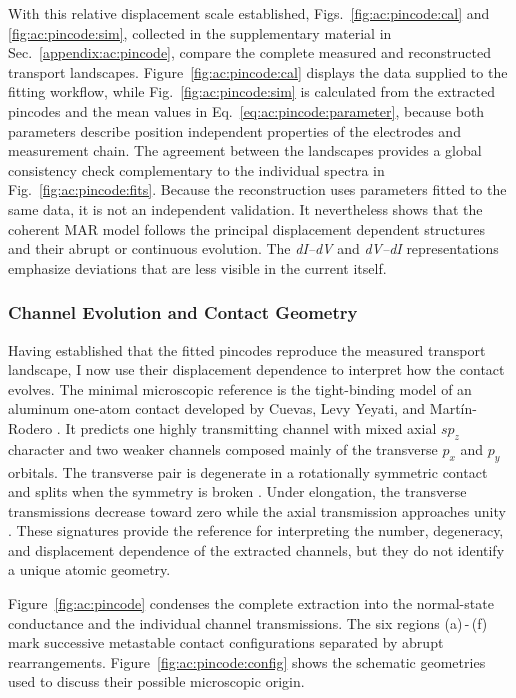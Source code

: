         With this relative displacement scale established, Figs.~\ref{fig:ac:pincode:cal} and \ref{fig:ac:pincode:sim}, collected in the supplementary material in Sec.~\ref{appendix:ac:pincode}, compare the complete measured and reconstructed transport landscapes. Figure~\ref{fig:ac:pincode:cal} displays the data supplied to the fitting workflow, while Fig.~\ref{fig:ac:pincode:sim} is calculated from the extracted pincodes and the mean values in Eq.~\eqref{eq:ac:pincode:parameter}, because both parameters describe position independent properties of the electrodes and measurement chain. The agreement between the landscapes provides a global consistency check complementary to the individual spectra in Fig.~\ref{fig:ac:pincode:fits}. Because the reconstruction uses parameters fitted to the same data, it is not an independent validation. It nevertheless shows that the coherent MAR model follows the principal displacement dependent structures and their abrupt or continuous evolution. The \textit{dI--dV} and \textit{dV--dI} representations emphasize deviations that are less visible in the current itself.


    \subsubsection*{Channel Evolution and Contact Geometry}

        Having established that the fitted pincodes reproduce the measured transport landscape, I now use their displacement dependence to interpret how the contact evolves. The minimal microscopic reference is the tight-binding model of an aluminum one-atom contact developed by Cuevas, Levy Yeyati, and Mart{\'i}n-Rodero \cite{cuevas_microscopic_1998}. It predicts one highly transmitting channel with mixed axial $sp_z$ character and two weaker channels composed mainly of the transverse $p_x$ and $p_y$ orbitals. The transverse pair is degenerate in a rotationally symmetric contact and splits when the symmetry is broken \cite{scheer_signature_1998}. Under elongation, the transverse transmissions decrease toward zero while the axial transmission approaches unity \cite{cuevas_evolution_1998}. These signatures provide the reference for interpreting the number, degeneracy, and displacement dependence of the extracted channels, but they do not identify a unique atomic geometry.

        Figure~\ref{fig:ac:pincode} condenses the complete extraction into the normal-state conductance and the individual channel transmissions. The six regions (a)\,-\,(f) mark successive metastable contact configurations separated by abrupt rearrangements. Figure~\ref{fig:ac:pincode:config} shows the schematic geometries used to discuss their possible microscopic origin.

